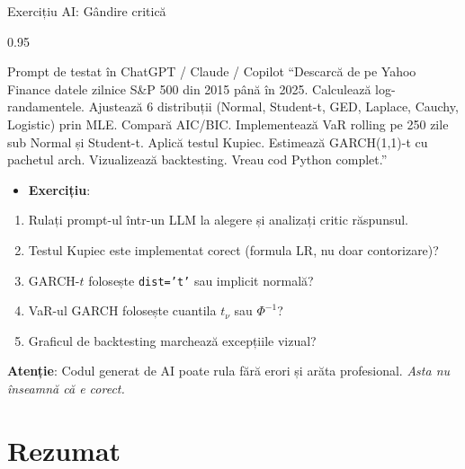 \documentclass[9pt, aspectratio=169, t]{beamer}
\begin{document}
\begin{frame}{Exercițiu AI: Gândire critică}
    \begin{cminipage}{0.95\textwidth}
    \vspace{-3mm}
    \begin{block}{\footnotesize Prompt de testat în ChatGPT / Claude / Copilot}
        {\footnotesize
        ``Descarcă de pe Yahoo Finance datele zilnice S\&P 500 din 2015 până în 2025. Calculează log-randamentele. Ajustează 6 distribuții (Normal, Student-t, GED, Laplace, Cauchy, Logistic) prin MLE. Compară AIC/BIC. Implementează VaR rolling pe 250 zile sub Normal și Student-t. Aplică testul Kupiec. Estimează GARCH(1,1)-t cu pachetul arch. Vizualizează backtesting. Vreau cod Python complet.''
        }
    \end{block}
    \vspace{-2mm}
    {\footnotesize
    \begin{itemize}\setlength{\itemsep}{0pt}
        \item \textbf{Exercițiu}:
    \end{itemize}
    \begin{enumerate}\setlength{\itemsep}{0pt}
        \item Rulați prompt-ul într-un LLM la alegere și analizați critic răspunsul.
        \item Testul Kupiec este implementat corect (formula LR, nu doar contorizare)?
        \item GARCH-$t$ folosește \texttt{dist='t'} sau implicit normală?
        \item VaR-ul GARCH folosește cuantila $t_\nu$ sau $\Phi^{-1}$?
        \item Graficul de backtesting marchează excepțiile vizual?
    \end{enumerate}
    }
    \vspace{-2mm}
    \begin{alertblock}{}
        {\footnotesize \textbf{Atenție}: Codul generat de AI poate rula fără erori și arăta profesional. \textit{Asta nu înseamnă că e corect.}}
    \end{alertblock}
    \end{cminipage}
\end{frame}

\section{Rezumat}
\end{document}

